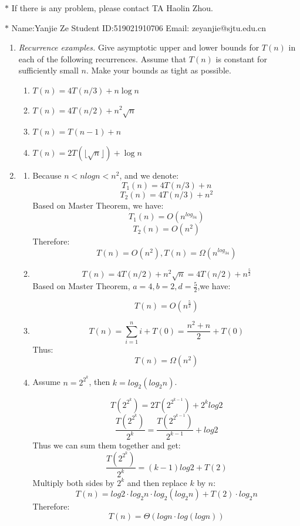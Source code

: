 \documentclass[12pt,a4paper]{article}
\makeatletter
\newtheorem*{solution}{Solution}
\theoremstyle{definition}
\renewenvironment{solution}[1][Solution] {\par\pushQED{\qed}\normalfont\topsep6\p@\@plus6\p@\relax\trivlist\item[\hskip\labelsep\bfseries#1\@addpunct{.}]\ignorespaces}{\popQED\endtrivlist\@endpefalse} \makeatother
\makeatother
\begin{document}
\noindent

\noindent{}
\begin{center}
\footnotesize{\color{red}$*$ If there is any problem, please contact TA Haolin Zhou. }

\footnotesize{\color{blue}$*$ Name:Yanjie Ze  \quad Student ID:519021910706 \quad Email: zeyanjie@sjtu.edu.cn}
\end{center}

\begin{enumerate}
\item
    \textit{Recurrence examples.} Give asymptotic upper and lower bounds for $T(n)$ in each of the following recurrences. Assume that $T(n)$ is constant for sufficiently small $n$. Make your bounds as tight as possible.
\begin{enumerate}
	\item $T(n)=4 T(n / 3)+n \log n$
	\item $T(n)=4 T(n / 2)+n^{2} \sqrt{n}$
	\item $T(n)=T(n-1)+n$	
	\item $T(n)=2T(\lfloor \sqrt n\rfloor)+\log n$
\end{enumerate}
\begin{solution}
\begin{enumerate}
\item 
Because $n<nlogn<n^2$, and we denote: 
$$T_1(n)=4 T(n / 3)+n$$
$$T_2(n)=4 T(n / 3)+n^2$$
Based on Master Theorem, we have:
$$
T_1(n)=O(n^{log_34})
$$
$$
T_2(n)=O(n^2)
$$
Therefore:
$$
T(n)=O(n^2), T(n)=\Omega(n^{log_34})
$$
\item
 $$
 T(n)=4 T(n / 2)+n^{2} \sqrt{n}=4 T(n / 2)+n^{\frac{5}{2}} 
 $$
 Based on Master Theorem, $a=4, b=2, d=\frac{5}{2}$,we have:
 
 $$
 T(n) = O(n^\frac{5}{2})
 $$
 
 \item
 $$
 \displaystyle T(n)=\sum_{i=1}^ni+T(0) = \frac{n^2+n}{2}+T(0)
 $$
 Thus:
 $$
 T(n)=\Omega(n^2)
 $$
 
 \item
Assume $n=2^{2^k}$, then $k=log_2(log_2n)$. 

$$
T(2^{2^k}) = 2T(2^{2^{k-1}})+2^klog2
$$
$$
\frac{T(2^{2^k})}{2^k} = \frac{T(2^{2^{k-1}})}{2^{k-1}}+log2
$$
Thus we can sum them together and get:
$$
 \frac{T(2^{2^k})}{2^k} = (k-1)log2 + T(2)
$$
Multiply both sides by $2^k$ and then replace $k$ by $n$:
$$
T(n) = log2\cdot log_2n\cdot log_2(log_2n)+ T(2)\cdot log_2n
$$
Therefore:
$$
T(n) = \Theta(logn\cdot log(logn))
$$


\end{enumerate}
\end{solution}
\end{enumerate}
\end{document}
